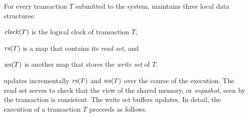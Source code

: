 For every transaction $T$ submitted to the system,  maintains three local data structures:
\begin{inparaenum}[]
\item $\clockOf{T}$ is the logical clock of transaction $T$,
\item $\readSetOf{T}$ is a map that contains its \emph{read set}, and 
\item $\writeSetOf{T}$ is another map that stores the \emph{write set} of $T$.
\end{inparaenum}
 updates incrementally $\readSetOf{T}$ and $\writeSetOf{T}$ over the course of the execution.
The read set serves to check that the view of the shared memory, or \emph{snpashot}, seen by the transaction is consistent.
The write set buffers updates.
In detail, the execution of a transaction $T$ proceeds as follows.

